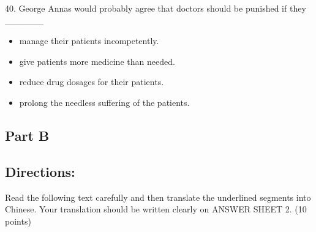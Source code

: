 \documentclass[UTF8,11pt]{ctexart}
\begin{document}
40. George Annas would probably agree that doctors should be punished if they \_\_\_\_\_\_


\begin{itemize}[leftmargin=2em,itemsep=.2em,topsep=.4em]\item[A.] manage their patients incompetently.
\item[B.] give patients more medicine than needed.
\item[C.] reduce drug dosages for their patients.
\item[D.] prolong the needless suffering of the patients.
\end{itemize}

\subsection*{\textbf{Part B}}


\subsection*{\textbf{Directions:}}


Read the following text carefully and then translate the underlined segments into Chinese. Your translation should be written clearly on ANSWER SHEET 2. (10 points)
\end{document}
